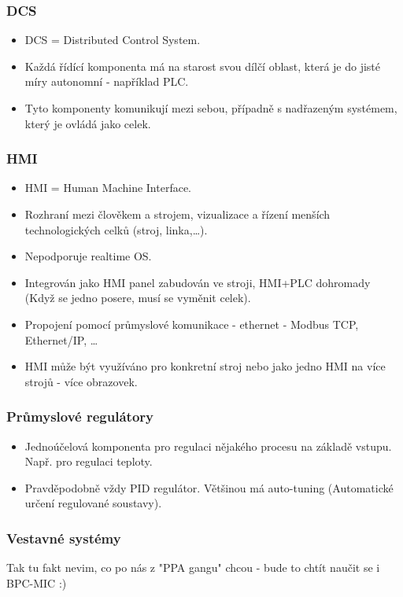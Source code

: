 \subsubsection*{DCS}
\begin{itemize}
  \item DCS = Distributed Control System.
  \item Každá řídící komponenta má na starost svou dílčí oblast, která je do jisté míry autonomní - například PLC.
  \item Tyto komponenty komunikují mezi sebou, případně s nadřazeným systémem, který je ovládá jako celek.
\end{itemize}

\subsubsection*{HMI}
\begin{itemize}
  \item HMI = Human Machine Interface.
  \item Rozhraní mezi člověkem a strojem, vizualizace a řízení menších technologických celků (stroj, linka,\dots).
  \item Nepodporuje realtime OS.
  \item Integrován jako HMI panel zabudován ve stroji, HMI+PLC dohromady (Když se jedno posere, musí se vyměnit celek).
  \item Propojení pomocí průmyslové komunikace - ethernet - Modbus TCP, Ethernet/IP, \dots
  \item HMI může být využíváno pro konkretní stroj nebo jako jedno HMI na více strojů - více obrazovek.
\end{itemize}

\subsubsection*{Průmyslové regulátory}
\begin{itemize}
  \item Jednoúčelová komponenta pro regulaci nějakého procesu na základě vstupu. Např. pro regulaci teploty.
  \item Pravděpodobně vždy PID regulátor. Většinou má auto-tuning (Automatické určení regulované soustavy).
\end{itemize}

\subsubsection*{Vestavné systémy}
Tak tu fakt nevim, co po nás z "PPA gangu" chcou - bude to chtít naučit se i BPC-MIC :)

